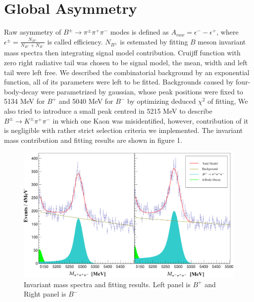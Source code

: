 \documentclass[12pt, twoside, notitlepage, twocolumn]{article}
\begin{document}
        \section{Global Asymmetry}
        Raw asymmetry of $B^{\pm}\rightarrow\pi^{\pm}\pi^{+}\pi^{-}$ modes is defined as $A_{raw} = \epsilon^--\epsilon^+$, 
        where $\epsilon^\pm = \frac{N_{B^\pm}}{N_{B^+}+N_{B^-}}$ is called efficiency. $N_{B^\pm}$ is estemated by fitting $B$ 
        meson invariant mass spectra then integrating signal model contribution. Cruijff function with zero right radiative 
        tail was chosen to be signal model, the mean, width and left tail were left free. We described the combinatorial 
        background by an exponential function, all of its parameters were left to be fitted. Backgrounds caused by four-body-decay 
        were parametrized by gaussian, whose peak positions were fixed to 5134 MeV for $B^+$ and 5040 MeV for $B^-$ by optimizing 
        deduced $\chi^2$ of fitting,  We also tried to introduce a small peak centred in 5215 MeV to describe 
        $B^{\pm}\rightarrow K^{\pm}\pi^{+}\pi^{-}$ in which one Kaon was misidentified, however, contribution of it is negligible 
        with rather strict selection criteria we implemented. The invariant mass contribution and fitting results are shown in figure 1.
        \begin{figure}[!hb]
            \begin{centering}
            \includegraphics[scale=0.276]{GA.png}
            \caption{Invariant mass spectra and fitting results. \newline Left panel is $B^+$ and Right panel is $B^-$}
            \end{centering}
            \label{fig:label1}
        \end{figure}
\end{document}
